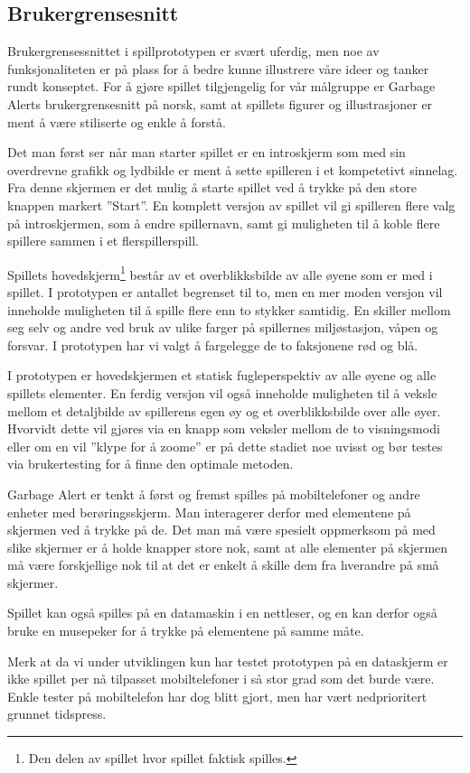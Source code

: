 


\subsection{Brukergrensesnitt}

Brukergrensessnittet i spillprototypen er svært uferdig, men noe av funksjonaliteten er på plass for å bedre kunne illustrere våre ideer og tanker rundt konseptet. 
For å gjøre spillet tilgjengelig for vår målgruppe er Garbage Alerts brukergrensesnitt på norsk, samt at spillets figurer og illustrasjoner er ment å være stiliserte og enkle å forstå.


Det man først ser når man starter spillet er en introskjerm som med sin overdrevne grafikk og lydbilde er ment å sette spilleren i et kompetetivt sinnelag.
Fra denne skjermen er det mulig å starte spillet ved å trykke på den store knappen markert ''Start''.
En komplett versjon av spillet vil gi spilleren flere valg på introskjermen, som å endre spillernavn, samt gi muligheten til å koble flere spillere sammen i et flerspillerspill.


Spillets hovedskjerm\footnote{Den delen av spillet hvor spillet faktisk spilles.} består av et overblikksbilde av alle øyene som er med i spillet. I prototypen er antallet begrenset til to, men en mer moden versjon vil inneholde muligheten til å spille flere enn to stykker samtidig. En skiller mellom seg selv og andre ved bruk av ulike farger på spillernes miljøstasjon, våpen og forsvar. I prototypen har vi valgt å fargelegge de to faksjonene rød og blå.

I prototypen er hovedskjermen et statisk fugleperspektiv av alle øyene og alle spillets elementer. En ferdig versjon vil også inneholde muligheten til å veksle mellom et detaljbilde av spillerens egen øy og et overblikksbilde over alle øyer. Hvorvidt dette vil gjøres via en knapp som veksler mellom de to visningsmodi eller om en vil ''klype for å zoome'' er på dette stadiet noe uvisst og bør testes via brukertesting for å finne den optimale metoden.

Garbage Alert er tenkt å først og fremst spilles på mobiltelefoner og andre enheter med berøringsskjerm. Man interagerer derfor med elementene på skjermen ved å trykke på de. Det man må være spesielt oppmerksom på med slike skjermer er å holde knapper store nok, samt at alle elementer på skjermen må være forskjellige nok til at det er enkelt å skille dem fra hverandre på små skjermer.

Spillet kan også spilles på en datamaskin i en nettleser, og en kan derfor også bruke en musepeker for å trykke på elementene på samme måte.

Merk at da vi under utviklingen kun har testet prototypen på en dataskjerm er ikke spillet per nå tilpasset mobiltelefoner i så stor grad som det burde være. Enkle tester på mobiltelefon har dog blitt gjort, men har vært nedprioritert grunnet tidspress.
